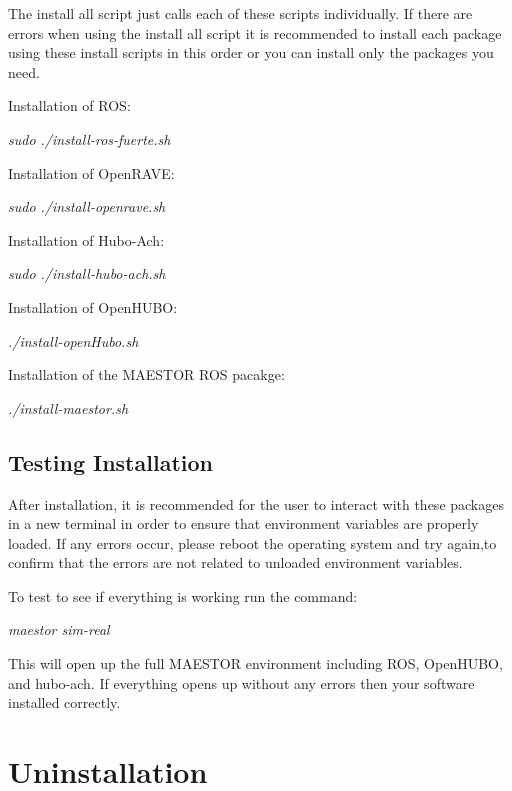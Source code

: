 \documentclass[12pt]{article}
\begin{document}
The install all script just calls each of these scripts individually. If there are errors when using the install all script it is recommended to install each package using these install scripts in this order or you can install only the packages you need.  

Installation of ROS:

\begin{center}
	\textit{sudo ./install-ros-fuerte.sh}
\end{center}

Installation of OpenRAVE:
\begin{center}
	\textit{sudo ./install-openrave.sh}
\end{center}

Installation of Hubo-Ach:
\begin{center}
	\textit{	sudo ./install-hubo-ach.sh}
\end{center}
	
Installation of OpenHUBO:
\begin{center}
	\textit{./install-openHubo.sh}
\end{center}

Installation of the MAESTOR ROS pacakge:
\begin{center}
	\textit{./install-maestor.sh}
\end{center}
	
\subsection{Testing Installation}

After installation, it is recommended for the user to interact with these packages in a new terminal in order to ensure that environment variables are properly loaded. If any errors occur, please reboot the operating system and try again,to confirm that the errors are not related to unloaded environment variables.

To test to see if everything is working run the command:

\begin{center}
	\textit{maestor sim-real}
\end{center} 

This will open up the full MAESTOR environment including ROS, OpenHUBO, and hubo-ach. If everything opens up without any errors then your software installed correctly. 
	
\section{Uninstallation}
\end{document}
